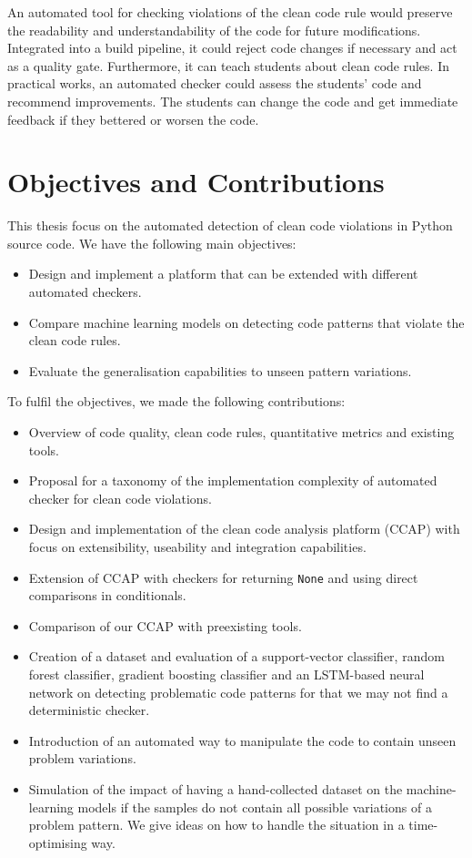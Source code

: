 An automated tool for checking violations of the clean code rule would preserve the readability and understandability of the code for future modifications. Integrated into a build pipeline, it could reject code changes if necessary and act as a quality gate.
Furthermore, it can teach students about clean code rules. In practical works, an automated checker could assess the students' code and recommend improvements. The students can change the code and get immediate feedback if they bettered or worsen the code.


\section{Objectives and Contributions}
This thesis focus on the automated detection of clean code violations in Python source code. 
We have the following main objectives:
\begin{itemize}
    \item Design and implement a platform that can be extended with different automated checkers.
    \item Compare machine learning models on detecting code patterns that violate the clean code rules.
    \item Evaluate the generalisation capabilities to unseen pattern variations.  
\end{itemize}

To fulfil the objectives, we made the following contributions:
\begin{itemize}
    \item Overview of code quality, clean code rules, quantitative metrics and existing tools.
    \item Proposal for a taxonomy of the implementation complexity of automated checker for clean code violations.
    \item Design and implementation of the clean code analysis platform (CCAP) with focus on extensibility, useability and integration capabilities.
    \item Extension of CCAP with checkers for returning \texttt{None} and using direct comparisons in conditionals.
    \item Comparison of our CCAP with preexisting tools.
    \item Creation of a dataset and evaluation of a support-vector classifier, random forest classifier, gradient boosting classifier and an LSTM-based neural network on detecting problematic code patterns for that we may not find a deterministic checker.
    \item Introduction of an automated way to manipulate the code to contain unseen problem variations.
    \item Simulation of the impact of having a hand-collected dataset on the machine-learning models if the samples do not contain all possible variations of a problem pattern. We give ideas on how to handle the situation in a time-optimising way.
\end{itemize}

